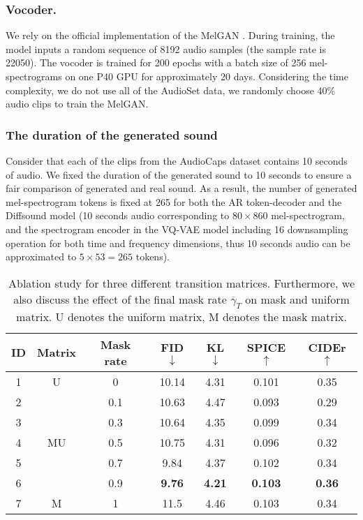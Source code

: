 \documentclass[lettersize,journal]{IEEEtran}
\begin{document}
\subsubsection{Vocoder.} We rely on the official implementation of the MelGAN \cite{kumar2019melgan}. During training, the model
inputs a random sequence of 8192 audio samples (the sample rate is 22050). The vocoder is trained for 200 epochs with a batch size of 256 mel-spectrograms on one P40 GPU for approximately 20 days. {\color{black}Considering the time complexity, we do not use all of the AudioSet data, we randomly choose 40\% audio clips to train the MelGAN.} \\
\subsubsection{The duration of the generated sound}
Consider that each of the clips from the AudioCaps dataset contains 10 seconds of audio. We fixed the duration of the generated sound to 10 seconds to ensure a fair comparison of generated and real sound. {\color{black}As a result, the number of generated mel-spectrogram tokens is fixed at 265 for both the AR token-decoder and the Diffsound model (10 seconds audio corresponding to $80 \times 860$ mel-spectrogram, and the spectrogram encoder in the VQ-VAE model including 16 downsampling operation for both time and frequency dimensions, thus 10 seconds audio can be approximated to $5 \times 53 = 265$ tokens).}






\begin{table}[t] \centering
\caption{Ablation study for three different transition matrices. Furthermore, we also discuss the effect of the final mask rate $\overline{\gamma}_T$ on mask and uniform matrix. U denotes the uniform matrix, M denotes the mask matrix.}
\label{tab:my-table4}
\begin{tabular}{ccccccc}
\hline
ID & Matrix                   & Mask rate & FID$\downarrow$   & KL$\downarrow$   & SPICE$\uparrow$ & CIDEr$\uparrow$ \\ \hline
1  & U                        & 0         & 10.14 & 4.31 & 0.101 & 0.35  \\ \hline
2  & \multirow{5}{*}{MU} & 0.1       & 10.63 & 4.47 & 0.093 & 0.29  \\
3  &                          & 0.3       & 10.64 & 4.35 & 0.099 & 0.34  \\
4  &                          & 0.5       & 10.75 & 4.31 & 0.096 & 0.32  \\
5  &                          & 0.7       & 9.84  & 4.37 & 0.102 & 0.34  \\
6  &                          & 0.9       & \textbf{9.76}  & \textbf{4.21} & \textbf{0.103} & \textbf{0.36}  \\ \hline
7  & M                        & 1         & 11.5  & 4.46 & 0.103 & 0.34  \\ \hline
\end{tabular}
\end{table}
\end{document}
